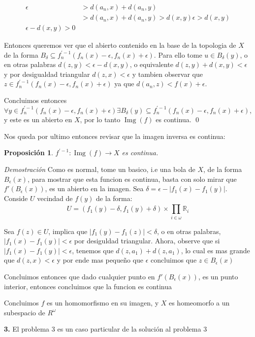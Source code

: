 \documentclass[]{article}
\newtheorem{prop}{Proposición}
\newcommand{\abs}[1]{\left| #1 \right|}
\newcommand{\RR}{\mathbb{R}}
\newcommand{\function}[3]{#1 : #2 \rightarrow #3}
\newcommand{\contained}{\subseteq}
\begin{document}
 \begin{align*}
 \epsilon &> d(a_n,x) + d(a_n,y) \\
  &> d(a_n,x) + d(a_n,y) > d(x,y)
  \epsilon > d(x,y) \\
  \epsilon - d(x,y) > 0
 \end{align*}
 
 Entonces queremos ver que el abierto contenido en la base de la topologia de $X$ de la forma $ B_{\delta} \contained f^{'-1}_n(f_n(x) - \epsilon, f_n(x) + \epsilon). $ Para ello tome $u \in B_{\delta}(y)$, o en otras palabras $ d(z,y) < \epsilon - d(x,y) $, o equivalente $ d(z,y) + d(x,y) < \epsilon $ y por desigualdad triangular $ d(z,x) < \epsilon $ y tambien observar que $ z \in f^{'-1}_n(f_n(x) - \epsilon, f_n(x) + \epsilon) $ ya que $ d(a_n,z) < f(x) +\epsilon $.
 
 Concluimos entonces $ \forall y \in f^{'-1}_n(f_n(x) - \epsilon, f_n(x) + \epsilon) \exists B_{\delta}(y) \contained f^{'-1}_n(f_n(x) - \epsilon, f_n(x) + \epsilon)$, y este es un abierto en $X$, por lo tanto $ \operatorname{Img}(f) $ es continua. \qed
 
 Nos queda por ultimo entonces revisar que la imagen inversa es continua:
 
 \begin{prop}
 	$ \function{f^{'-1}}{\operatorname{Img}(f)}{X} $ es continua.
 \end{prop}
 
 \textit{Demostración}
 Como es normal, tome un basico, i.e una bola de $X$, de la forma $ B_\epsilon(x) $, para mostrar que esta funcion es continua, basta con solo mirar que $ f'(B_\epsilon(x)) $, es un abierto en la imagen. Sea $ \delta = \epsilon - \abs{f_1(x) - f_1(y)} $. Conside $U$ vecindad de $ f(y) $ de la forma:
 \[ U = (f_1(y) - \delta, f_1(y) + \delta) \times \prod_{i \in \omega}^{} \RR_i \]
 
 Sea $ f(z) \in U $, implica que $ \abs{f_1(y) - f_1(z)} < \delta $, o en otras palabras, $ \abs{f_1(x)-f_1(y)} < \epsilon $ por desiguldad triangular. Ahora, observe que si $ \abs{f_1(x)-f_1(y)} < \epsilon  $, tenemos que $ d(z,a_1) + d(z,a_1) $, lo cual es mas grande que $ d(z,x) < \epsilon $ y por ende mas pequeño que $ \epsilon $ concluimos que $ z \in B_{\epsilon}(x) $
 
 Concluimos entonces que dado cualquier punto en $ f'(B_{\epsilon}(x)) $, es un punto interior, entonces concluimos que la funcion es continua 
 
 \qedsymbol
 
 Concluimos $f$ es un homomorfismo en su imagen, y $X$ es homeomorfo a un subespacio de $ R^\omega $
 
 \textbf{3.} El problema $ 3 $ es un caso particular de la solución al problema $3$
\end{document}
